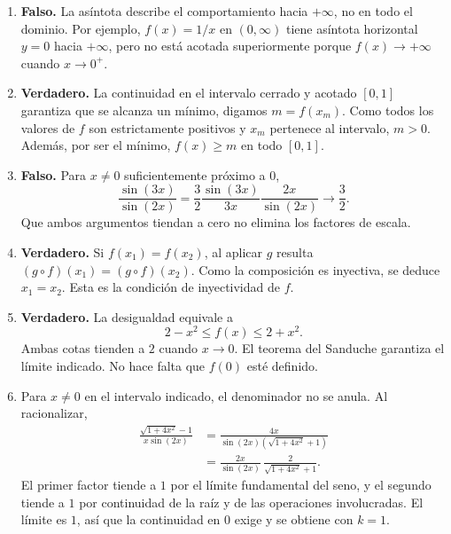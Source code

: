 \documentclass[10pt,a5paper]{article}
\newif\ifmostrarSoluciones
\begin{document}
\ifmostrarSoluciones
\newpage
\begin{solucion}
\begin{enumerate}
  \item \textbf{Falso.} La asíntota describe el comportamiento hacia $+\infty$, no en todo el dominio. Por ejemplo, $f(x)=1/x$ en $(0,\infty)$ tiene asíntota horizontal $y=0$ hacia $+\infty$, pero no está acotada superiormente porque $f(x)\to+\infty$ cuando $x\to0^+$.
  \item \textbf{Verdadero.} La continuidad en el intervalo cerrado y acotado $[0,1]$ garantiza que se alcanza un mínimo, digamos $m=f(x_m)$. Como todos los valores de $f$ son estrictamente positivos y $x_m$ pertenece al intervalo, $m>0$. Además, por ser el mínimo, $f(x)\geq m$ en todo $[0,1]$.
  \item \textbf{Falso.} Para $x\neq0$ suficientemente próximo a $0$,
  \[
    \frac{\sin(3x)}{\sin(2x)}
    =\frac32\frac{\sin(3x)}{3x}\frac{2x}{\sin(2x)}
    \longrightarrow\frac32.
  \]
  Que ambos argumentos tiendan a cero no elimina los factores de escala.

  \item \textbf{Verdadero.} Si $f(x_1)=f(x_2)$, al aplicar $g$ resulta $(g\circ f)(x_1)=(g\circ f)(x_2)$. Como la composición es inyectiva, se deduce $x_1=x_2$. Esta es la condición de inyectividad de $f$.
  \item \textbf{Verdadero.} La desigualdad equivale a
  \[
    2-x^2\leq f(x)\leq2+x^2.
  \]
  Ambas cotas tienden a $2$ cuando $x\to0$. El teorema del Sanduche garantiza el límite indicado. No hace falta que $f(0)$ esté definido.
  \item Para $x\neq0$ en el intervalo indicado, el denominador no se anula. Al racionalizar,
  \begin{align*}
    \frac{\sqrt{1+4x^2}-1}{x\sin(2x)}
    &=\frac{4x}{\sin(2x)(\sqrt{1+4x^2}+1)}\\
    &=\frac{2x}{\sin(2x)}\,
      \frac{2}{\sqrt{1+4x^2}+1}.
  \end{align*}
  El primer factor tiende a $1$ por el límite fundamental del seno, y el segundo tiende a $1$ por continuidad de la raíz y de las operaciones involucradas. El límite es $1$, así que la continuidad en $0$ exige y se obtiene con $k=1$.


\end{enumerate}
\end{solucion}
\end{document}
